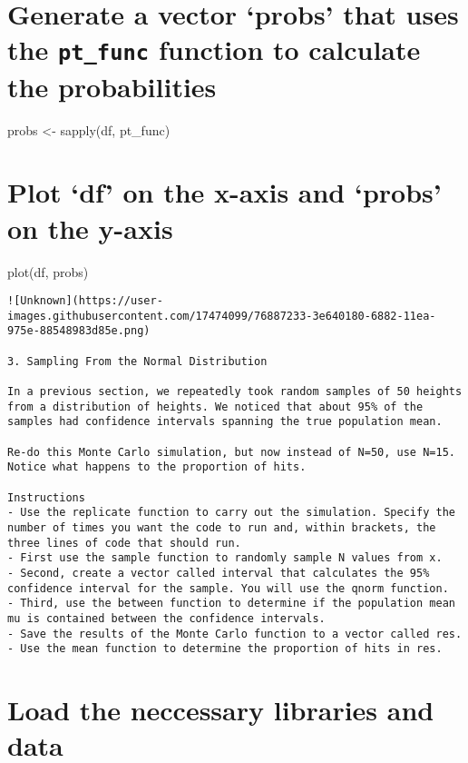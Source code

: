 \documentclass[
]{article}
\begin{document}
\hypertarget{generate-a-vector-probs-that-uses-the-pt_func-function-to-calculate-the-probabilities}{%
\section{\texorpdfstring{Generate a vector `probs' that uses the
\texttt{pt\_func} function to calculate the
probabilities}{Generate a vector `probs' that uses the pt\_func function to calculate the probabilities}}\label{generate-a-vector-probs-that-uses-the-pt_func-function-to-calculate-the-probabilities}}

probs \textless- sapply(df, pt\_func)

\hypertarget{plot-df-on-the-x-axis-and-probs-on-the-y-axis}{%
\section{Plot `df' on the x-axis and `probs' on the
y-axis}\label{plot-df-on-the-x-axis-and-probs-on-the-y-axis}}

plot(df, probs)

\begin{verbatim}
![Unknown](https://user-images.githubusercontent.com/17474099/76887233-3e640180-6882-11ea-975e-88548983d85e.png)

3. Sampling From the Normal Distribution

In a previous section, we repeatedly took random samples of 50 heights from a distribution of heights. We noticed that about 95% of the samples had confidence intervals spanning the true population mean.

Re-do this Monte Carlo simulation, but now instead of N=50, use N=15. Notice what happens to the proportion of hits.

Instructions
- Use the replicate function to carry out the simulation. Specify the number of times you want the code to run and, within brackets, the three lines of code that should run.
- First use the sample function to randomly sample N values from x.
- Second, create a vector called interval that calculates the 95% confidence interval for the sample. You will use the qnorm function.
- Third, use the between function to determine if the population mean mu is contained between the confidence intervals.
- Save the results of the Monte Carlo function to a vector called res.
- Use the mean function to determine the proportion of hits in res.
\end{verbatim}

\hypertarget{load-the-neccessary-libraries-and-data}{%
\section{Load the neccessary libraries and
data}\label{load-the-neccessary-libraries-and-data}}
\end{document}

